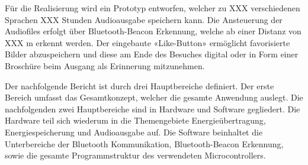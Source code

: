 Für die Realisierung wird ein Prototyp entworfen, welcher zu XXX verschiedenen Sprachen XXX Stunden Audioausgabe speichern kann. Die Ansteuerung der Audiofiles erfolgt über Bluetooth-Beacon Erkennung, welche ab einer Distanz von XXX m erkennt werden. Der eingebaute «Like-Button» ermöglicht favorisierte Bilder abzuspeichern und diese am Ende des Besuches digital oder in Form einer Broschüre beim Ausgang als Erinnerung mitzunehmen.

Der nachfolgende Bericht ist durch drei Hauptbereiche definiert. Der erste Bereich umfasst das Gesamtkonzept, welcher die gesamte Anwendung auslegt. Die nachfolgenden zwei Hauptbereiche sind in Hardware und Software gegliedert. Die Hardware teil sich wiederum in die Themengebiete Energieübertragung, Energiespeicherung und Audioausgabe auf. Die Software beinhaltet die Unterbereiche der Bluetooth Kommunikation, Bluetooth-Beacon Erkennung, sowie die gesamte Programmstruktur des verwendeten Microcontrollers.
